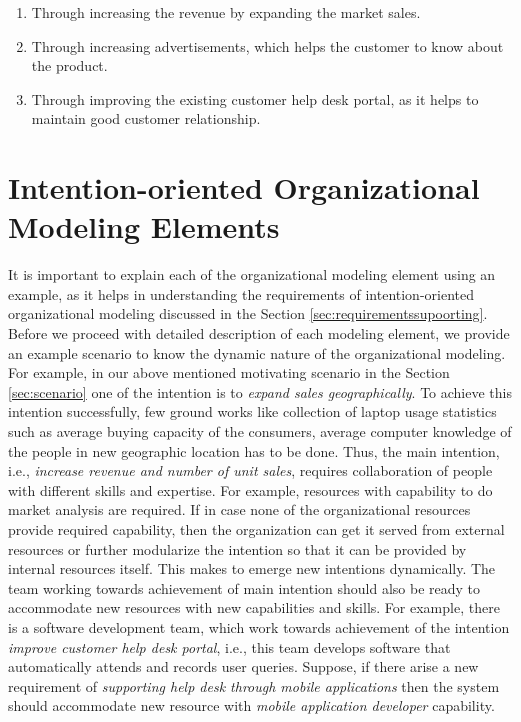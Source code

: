  \begin{enumerate}
 	\item Through increasing the revenue by expanding the market sales. 
 	\item Through increasing advertisements, which helps the customer to know about the product.
 	\item Through improving the existing customer help desk portal, as it helps to maintain good customer relationship.
 \end{enumerate}
 
\section{Intention-oriented Organizational Modeling Elements}
\label{sec:entities}
It is important to explain each of the organizational modeling element using an example, as it helps in understanding the requirements of intention-oriented organizational modeling discussed in the Section \ref{sec:requirementssupoorting}. Before we proceed with detailed description of each modeling element, we provide an example scenario to know the dynamic nature of the organizational modeling. For example, in our above mentioned motivating scenario in the Section \ref{sec:scenario} one of the intention is to \textit{expand sales geographically}. To achieve this intention successfully, few ground works like collection of laptop usage statistics such as average buying capacity of the consumers, average computer knowledge of the people in new geographic location has to be done. Thus, the main intention, i.e., \textit{increase revenue and number of unit sales}, requires collaboration of people with different skills and expertise. For example, resources with capability to do market analysis are required. If in case none of the organizational resources provide required capability, then the organization can get it served from external resources or further modularize the intention so that it can be provided by internal resources itself. This makes to emerge new intentions dynamically. The team working towards achievement of main intention should also be ready to accommodate new resources with new capabilities and skills. For example, there is a software development team, which work towards achievement of the intention \textit{improve customer help desk portal}, i.e., this team develops software that automatically attends and records user queries. Suppose, if there arise a new requirement of \textit{supporting help desk through mobile applications} then the system should accommodate new resource with \textit{mobile application developer} capability. 

